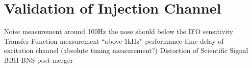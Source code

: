 




\chapter{Validation of Injection Channel}
Noise measurement
around 100Hz  the nose should below the IFO sensitivity
Transfer Function measurement
“above 1kHz” performance
time delay of excitation channel
(absolute timing measurement?)
Distortion of Scientific Signal
BBH
BNS post merger


\cite{lee2003enlisting}

